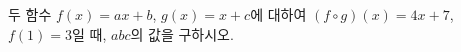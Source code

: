 \hspace*{2mm}\begin{minipage}[t]{\dimexpr\linewidth-2mm\relax}\vspace{0pt}
두 함수 $f(x)=ax+b$, $g(x)=x+c$에 대하여 $(f\circ g)(x)=4x+7$, $f(1)=3$일 때, $abc$의 값을 구하시오. \end{minipage}
